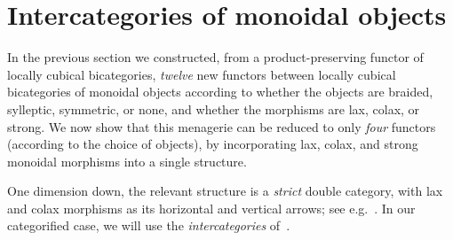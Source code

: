 \section{Intercategories of monoidal objects}
\label{sec:intercat}

In the previous section we constructed, from a product-preserving functor of locally cubical bicategories, \emph{twelve} new functors between locally cubical bicategories of monoidal objects according to whether the objects are braided, sylleptic, symmetric, or none, and whether the morphisms are lax, colax, or strong.
We now show that this menagerie can be reduced to only \emph{four} functors (according to the choice of objects), by incorporating lax, colax, and strong monoidal morphisms into a single structure.

One dimension down, the relevant structure is a \emph{strict} double category, with lax and colax morphisms as its horizontal and vertical arrows; see e.g.~\cite{gp:double-adjoints,shulman:dblderived}.
In our categorified case, we will use the \emph{intercategories} of~\cite{gp:intercategories-i,gp:intercategories-ii}.



